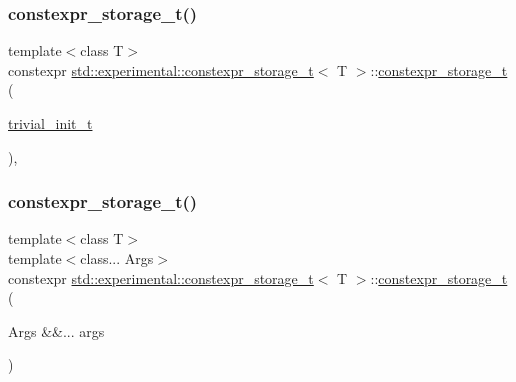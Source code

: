 \subsubsection{\texorpdfstring{constexpr\+\_\+storage\+\_\+t()}{constexpr\_storage\_t()}\hspace{0.1cm}{\footnotesize\ttfamily [1/2]}}
{\footnotesize\ttfamily template$<$class T$>$ \\
constexpr \hyperlink{unionstd_1_1experimental_1_1constexpr__storage__t}{std\+::experimental\+::constexpr\+\_\+storage\+\_\+t}$<$ T $>$\+::\hyperlink{unionstd_1_1experimental_1_1constexpr__storage__t}{constexpr\+\_\+storage\+\_\+t} (\begin{DoxyParamCaption}\item[{\hyperlink{structstd_1_1experimental_1_1trivial__init__t}{trivial\+\_\+init\+\_\+t}}]{ }\end{DoxyParamCaption})\hspace{0.3cm}{\ttfamily [inline]}, {\ttfamily [noexcept]}}

\mbox{\label{unionstd_1_1experimental_1_1constexpr__storage__t_a643de5b95dac28e87811c7ff4890cd19}} 
\subsubsection{\texorpdfstring{constexpr\+\_\+storage\+\_\+t()}{constexpr\_storage\_t()}\hspace{0.1cm}{\footnotesize\ttfamily [2/2]}}
{\footnotesize\ttfamily template$<$class T$>$ \\
template$<$class... Args$>$ \\
constexpr \hyperlink{unionstd_1_1experimental_1_1constexpr__storage__t}{std\+::experimental\+::constexpr\+\_\+storage\+\_\+t}$<$ T $>$\+::\hyperlink{unionstd_1_1experimental_1_1constexpr__storage__t}{constexpr\+\_\+storage\+\_\+t} (\begin{DoxyParamCaption}\item[{Args \&\&...}]{args }\end{DoxyParamCaption})\hspace{0.3cm}{\ttfamily [inline]}}

